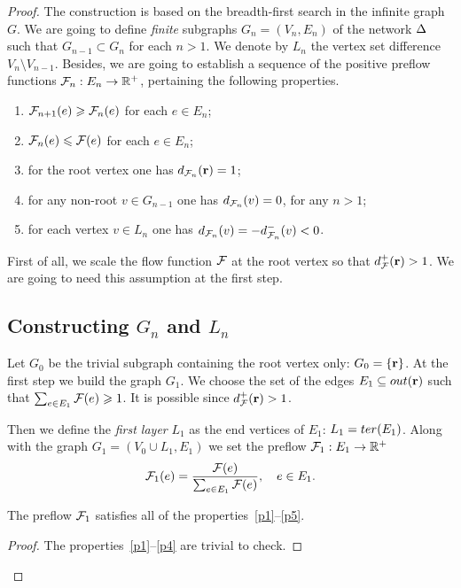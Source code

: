 \documentclass[12pt,oneside,a4paper]{amsart}
\begin{document}
\begin{proof}
        The construction is based on the breadth-first search in the infinite graph $G$.
        We are going to define \emph{finite} subgraphs $G_n = (V_n, E_n)$ of the network $\Delta$ such that $G_{n-1} \subset G_{n}$ for each $n > 1$.
        We denote by $L_n$ the vertex set difference $V_n \setminus V_{n-1}$.
        Besides, we are going to establish a sequence of the positive preflow functions $\mathcal{F}_{n}: E_n \to \mathbb{R}^{+}$,
          pertaining the following properties.
        \begin{enumerate}[label=\textbf{P\arabic*}]
          \item \label{p1} $\mathcal{F}_{n+1}(e) \geqslant \mathcal{F}_{n}(e)$ for each $e \in E_n$;
          \item \label{p2} $\mathcal{F}_{n}(e) \leqslant \mathcal{F}(e)$ for each $e \in E_n$;
          \item \label{p3} for the root vertex one has $d_{\mathcal{F}_{n}}(\mathbf{r}) = 1$;
          \item \label{p4} for any non-root $v \in G_{n-1}$ one has $d_{\mathcal{F}_{n}}(v) = 0$, for any $n > 1$;
          \item \label{p5} for each vertex $v \in L_n$ one has $d_{\mathcal{F}_{n}}(v) = -d^{-}_{\mathcal{F}_{n}}(v) < 0$.
        \end{enumerate}
        First of all, we scale the flow function $\mathcal{F}$ at the root vertex so that $d^{+}_{\mathcal{F}}(\mathbf{r}) > 1$.
        We are going to need this assumption at the first step.
      \medskip
      \subsection{Constructing \texorpdfstring{$G_n$}{Gn} and \texorpdfstring{$L_n$}{Ln}}
        Let $G_0$ be the trivial subgraph containing the root vertex only: $G_0 = \left\{ \mathbf{r} \right\}$.
        At the first step we build the graph $G_1$.
        We choose the set of the edges $E_1 \subseteq out(\mathbf{r})$ such that $\sum_{e \in E_1} \mathcal{F}(e) \geqslant 1$.
        It is possible since $d^{+}_{\mathcal{F}}(\mathbf{r}) > 1$.

        Then we define the \emph{first layer} $L_1$ as the end vertices of $E_1$: $L_1 = ter(E_1)$.
        Along with the graph $G_1 = (V_0 \cup L_1, E_1)$ we set the preflow $\mathcal{F}_{1}: E_1 \to \mathbb{R}^{+}$
        \[
          \mathcal{F}_{1}(e) = \frac{\mathcal{F}(e)}{\sum_{e\in E_1}{\mathcal{F}(e)}}, \quad e \in E_1.
        \]
        \begin{prop}
          The preflow $\mathcal{F}_{1}$ satisfies all of the properties~\ref{p1}--\ref{p5}.
        \end{prop}
        \begin{proof}
          The properties~\ref{p1}--\ref{p4} are trivial to check.


\end{proof}
\end{proof}
\end{document}
